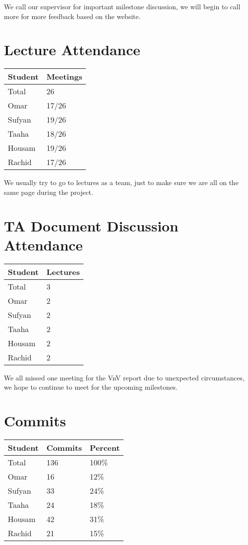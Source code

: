 \documentclass{article}
\begin{document}
We call our supervisor for important milestone discussion, we will begin to call more for more feedback based on the website. 
\section{Lecture Attendance}

\begin{table}[H]
\centering
\begin{tabular}{ll}
\toprule
\textbf{Student} & \textbf{Meetings}\\
\midrule
Total & 26\\
Omar & 17/26\\
Sufyan & 19/26\\
Taaha & 18/26\\
Housam & 19/26\\
Rachid & 17/26\\
\bottomrule
\end{tabular}
\end{table}

We usually try to go to lectures as a team, just to make sure we are all on the same page during the project. 
\section{TA Document Discussion Attendance}

\begin{table}[H]
\centering
\begin{tabular}{ll}
\toprule
\textbf{Student} & \textbf{Lectures}\\
\midrule
Total & 3\\
Omar & 2\\
Sufyan & 2\\
Taaha & 2\\
Housam & 2\\
Rachid & 2\\
\bottomrule
\end{tabular}
\end{table}

We all missed one meeting for the VnV report due to unexpected circumstances, we hope to continue to meet for the upcoming milestones. 
\section{Commits}

\begin{table}[H]
\centering
\begin{tabular}{lll}
\toprule
\textbf{Student} & \textbf{Commits} & \textbf{Percent}\\
\midrule
Total & 136 & 100\% \\
Omar & 16 & 12\% \\ 
Sufyan & 33 & 24\% \\  
Taaha & 24 & 18\% \\  
Housam & 42 & 31\% \\  
Rachid & 21 & 15\% \\  
\bottomrule
\end{tabular}
\end{table}
\end{document}
